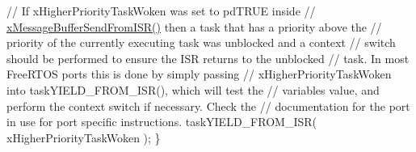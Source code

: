 \begin{DoxyPre}
\begin{DoxyPre}
\begin{DoxyPre}    // If xHigherPriorityTaskWoken was set to pdTRUE inside
    // \mbox{\hyperlink{message__buffer_8h_aeef5b0c4f8c2db6ca2230a8874813e79}{xMessageBufferSendFromISR()}} then a task that has a priority above the
    // priority of the currently executing task was unblocked and a context
    // switch should be performed to ensure the ISR returns to the unblocked
    // task.  In most FreeRTOS ports this is done by simply passing
    // xHigherPriorityTaskWoken into taskYIELD\_FROM\_ISR(), which will test the
    // variables value, and perform the context switch if necessary.  Check the
    // documentation for the port in use for port specific instructions.
    taskYIELD\_FROM\_ISR( xHigherPriorityTaskWoken );
\}
\end{DoxyPre}
 \end{DoxyPre}
\end{DoxyPre}
